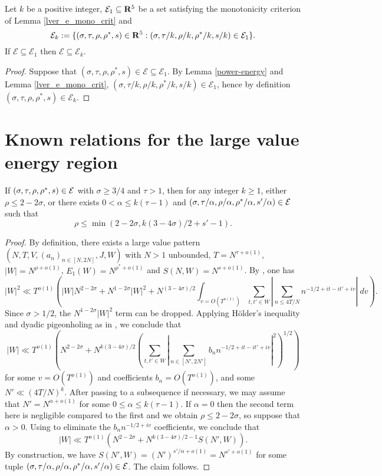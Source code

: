 \begin{lemma}
Let $k$ be a positive integer, $\mathcal{E}_1 \subseteq \mathbf{R}^{5}$ be a set satisfying the monotonicity criterion of Lemma \ref{lver_e_mono_crit} and
\[
\mathcal{E}_k := \{(\sigma, \tau, \rho, \rho^*, s) \in \mathbf{R}^5: (\sigma, \tau/k, \rho/k, \rho^*/k, s/k) \in \mathcal{E}_1\}.
\]
If $\mathcal{E}\subseteq \mathcal{E}_1$ then $\mathcal{E} \subseteq \mathcal{E}_k$.
\end{lemma}
\begin{proof}
Suppose that $(\sigma, \tau, \rho, \rho^*, s) \in \mathcal{E}\subseteq \mathcal{E}_1$. By Lemma \ref{power-energy} and Lemma \ref{lver_e_mono_crit}, $(\sigma, \tau/k, \rho/k, \rho^*/k, s/k) \in \mathcal{E}_1$, hence by definition $(\sigma, \tau, \rho, \rho^*, s) \in \mathcal{E}_k$.
\end{proof}
\section{Known relations for the large value energy region}

\begin{theorem}\label{reflect}\cite[\S 11.5]{ivic} If $(\sigma,\tau,\rho,\rho^*,s) \in \mathcal{E}$ with $\sigma \geq 3/4$ and $\tau>1$, then for any integer $k \geq 1$, either $\rho \leq 2-2\sigma$, or there exists $0 < \alpha \leq k(\tau-1)$ and $(\sigma, \tau/\alpha, \rho/\alpha, \rho^*/\alpha, s'/\alpha) \in \mathcal{E}$ such that
$$ \rho \leq \min( 2-2\sigma, k(3-4\sigma)/2 + s' - 1).$$
\end{theorem}

\begin{proof} By definition, there exists a large value pattern $(N,T,V,(a_n)_{n \in [N,2N]},J,W)$ with $N>1$ unbounded, $T = N^{\tau+o(1)}$, $|W| = N^{\rho+o(1)}$, $E_1(W) = N^{\rho^*+o(1)}$ and $S(N,W) = N^{s+o(1)}$.  By \cite[(11.58)]{ivic}, one has
$$ |W|^2 \ll T^{o(1)} \left( |W| N^{2-2\sigma} + N^{1-2\sigma} |W|^2 + N^{(3-4\sigma)/2} \int_{v = O(T^{o(1)})} \sum_{t,t' \in W} \left|\sum_{n \leq 4T/N} n^{-1/2+it-it'+iv}\right|\ dv \right).$$
Since $\sigma>1/2$, the $N^{1-2\sigma} |W|^2$ term can be dropped.  Applying H\"older's inequality and dyadic pigeonholing as in \cite[(11.59)]{ivic}, we conclude that
$$ |W| \ll T^{o(1)} \left(N^{2-2\sigma} + N^{k(3-4\sigma)/2}  \left(\sum_{t,t' \in W} \left|\sum_{n \in [N',2N']} b_n n^{-1/2+it-it'+iv}\right|^2\right)^{1/2}\right)$$
for some $v = O(T^{o(1)})$ and coefficients $b_n = O(T^{o(1)})$, and some $N' \ll (4T/N)^k$.  After passing to a subsequence if necessary, we may assume that $N' = N^{\alpha+o(1)}$ for some $0 \leq \alpha \leq k(\tau-1)$.  If $\alpha=0$ then the second term here is negligible compared to the first and we obtain $\rho \leq 2-2\sigma$, so suppose that $\alpha > 0$.  Using \cite[Lemma 11.1]{ivic} to eliminate the $b_n n^{-1/2+iv}$ coefficients, we conclude that
$$ |W| \ll T^{o(1)} (N^{2-2\sigma} + N^{k(3-4\sigma)/2-1} S(N', W)).$$
By construction, we have $S(N',W) = (N')^{s'/\alpha+o(1)} = N^{s'+o(1)}$ for some tuple $(\sigma, \tau/\alpha, \rho/\alpha, \rho^*/\alpha, s'/\alpha) \in \mathcal{E}$.  The claim follows.
\end{proof}

